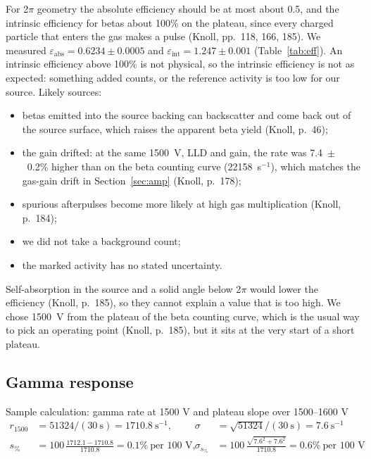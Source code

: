 \documentclass[12pt]{article}
\begin{document}
For 2$\pi$ geometry the absolute efficiency should be at most about 0.5, and the intrinsic efficiency for betas about 100\% on the plateau, since every charged particle that enters the gas makes a pulse (Knoll, pp.~118, 166, 185). We measured $\varepsilon_{\text{abs}} = 0.6234 \pm 0.0005$ and $\varepsilon_{\text{int}} = 1.247 \pm 0.001$ (Table~\ref{tab:eff}). An intrinsic efficiency above 100\% is not physical, so the intrinsic efficiency is not as expected: something added counts, or the reference activity is too low for our source. Likely sources:
\begin{itemize}
\item betas emitted into the source backing can backscatter and come back out of the source surface, which raises the apparent beta yield (Knoll, p.~46);
\item the gain drifted: at the same 1500~V, LLD and gain, the rate was 7.4~$\pm$~0.2\% higher than on the beta counting curve (22158~s$^{-1}$), which matches the gas-gain drift in Section~\ref{sec:amp} (Knoll, p.~178);
\item spurious afterpulses become more likely at high gas multiplication (Knoll, p.~184);
\item we did not take a background count;
\item the marked activity has no stated uncertainty.
\end{itemize}
Self-absorption in the source and a solid angle below 2$\pi$ would lower the efficiency (Knoll, p.~185), so they cannot explain a value that is too high. We chose 1500~V from the plateau of the beta counting curve, which is the usual way to pick an operating point (Knoll, p.~185), but it sits at the very start of a short plateau.

\subsection{Gamma response}

\begin{samplecalc}{Sample calculation: gamma rate at 1500 V and plateau slope over 1500--1600 V}
\begin{align*}
r_{1500} &= 51324/(30\ \text{s}) = 1710.8\ \text{s}^{-1}, & \sigma &= \sqrt{51324}/(30\ \text{s}) = 7.6\ \text{s}^{-1}\\
s_{\%} &= 100\,\frac{1712.1 - 1710.8}{1710.8} = 0.1\%\ \text{per 100 V}, & \sigma_{s_\%} &= 100\,\frac{\sqrt{7.6^2 + 7.6^2}}{1710.8} = 0.6\%\ \text{per 100 V}
\end{align*}
\end{samplecalc}
\end{document}
